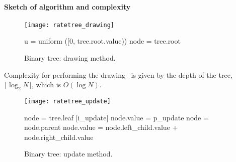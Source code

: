\paragraph {Sketch of algorithm and complexity}
\begin{figure}[!h]
  \begin{minipage}{0.5\textwidth}
    \texttt{[image: ratetree\_drawing]}
  \end{minipage}
  \begin{minipage}{0.5\textwidth}
    \begin{algorithm}[H]
      \SetAlgoLined
      u = uniform ([0, tree.root.value))\;
        node = tree.root\;
              {
              }
    \end{algorithm}
  \end{minipage}
  \caption{Binary tree: drawing method.}
  \label{fig:tree_drawing}
\end{figure}

Complexity for performing the drawing~ is given by the depth of the tree, $\lceil\log_2 N\rceil$, which is $O(\log N)$.

\begin{figure}[!h]
  \begin{minipage}{0.5\textwidth}
    \texttt{[image: ratetree\_update]}
  \end{minipage}
  \begin{minipage}{0.5\textwidth}
    \begin{algorithm}[H]
      \SetAlgoLined
      node = tree.leaf [i\_update]\;
      node.value = p\_update\;
            {
              node = node.parent\;
              node.value = node.left\_child.value + node.right\_child.value\;
            }
    \end{algorithm}
  \end{minipage}
  \caption{Binary tree: update method.}
  \label{fig:tree_update}
\end{figure}

